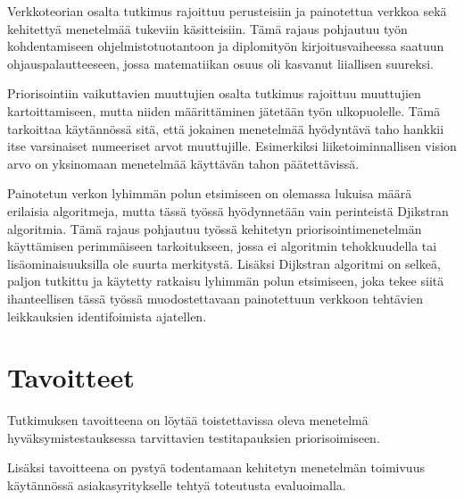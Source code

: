 Verkkoteorian osalta tutkimus rajoittuu perusteisiin ja painotettua verkkoa sekä kehitettyä menetelmää tukeviin käsitteisiin.
Tämä rajaus pohjautuu työn kohdentamiseen ohjelmistotuotantoon ja diplomityön kirjoitusvaiheessa saatuun ohjauspalautteeseen, jossa matematiikan osuus oli kasvanut liiallisen suureksi.

Priorisointiin vaikuttavien muuttujien osalta tutkimus rajoittuu muuttujien kartoittamiseen, mutta niiden määrittäminen jätetään työn ulkopuolelle.
Tämä tarkoittaa käytännössä sitä, että jokainen menetelmää hyödyntävä taho hankkii itse varsinaiset numeeriset arvot muuttujille.
Esimerkiksi liiketoiminnallisen vision arvo on yksinomaan menetelmää käyttävän tahon päätettävissä.

Painotetun verkon lyhimmän polun etsimiseen on olemassa lukuisa määrä erilaisia algoritmeja, mutta tässä työssä hyödynnetään vain perinteistä Djikstran algoritmia.
Tämä rajaus pohjautuu työssä kehitetyn priorisointimenetelmän käyttämisen perimmäiseen tarkoitukseen, jossa ei algoritmin tehokkuudella tai lisäominaisuuksilla ole suurta merkitystä.
Lisäksi Dijkstran algoritmi on selkeä, paljon tutkittu ja käytetty ratkaisu lyhimmän polun etsimiseen, joka tekee siitä ihanteellisen tässä työssä muodostettavaan painotettuun verkkoon tehtävien leikkauksien identifoimista ajatellen.

\section{Tavoitteet} \label{06_tavoitteet}

Tutkimuksen tavoitteena on löytää toistettavissa oleva menetelmä hyväksymistestauksessa tarvittavien testitapauksien priorisoimiseen.

Lisäksi tavoitteena on pystyä todentamaan kehitetyn menetelmän toimivuus käytännössä asiakasyritykselle tehtyä toteutusta evaluoimalla.
